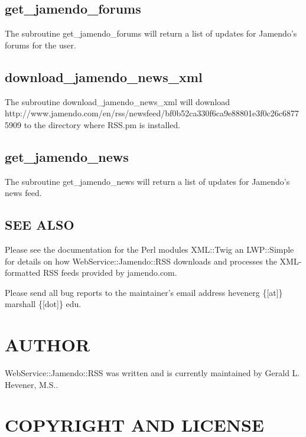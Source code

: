 \subsection*{get\_jamendo\_forums\label{get_jamendo_forums}}


The subroutine get\_jamendo\_forums will return a list of updates for Jamendo's forums for the user.

\subsection*{download\_jamendo\_news\_xml\label{download_jamendo_news_xml}}


The subroutine download\_jamendo\_news\_xml will download http://www.jamendo.com/en/rss/newsfeed/bf0b52ca330f6ca9e88801e3f0c26c68775909
to the directory where RSS.pm is installed.

\subsection*{get\_jamendo\_news\label{get_jamendo_news}}


The subroutine get\_jamendo\_news will return a list of updates for Jamendo's news feed.

\subsection*{SEE ALSO\label{SEE_ALSO}}


Please see the documentation for the Perl modules XML::Twig an LWP::Simple
for details on how WebService::Jamendo::RSS downloads and processes the XML-formatted
RSS feeds provided by jamendo.com.



Please send all bug reports to the maintainer's email address hevenerg \{[at]\} marshall \{[dot]\} edu.

\section{AUTHOR\label{AUTHOR}}


WebService::Jamendo::RSS was written and is currently maintained by Gerald L. Hevener, M.S..

\section{COPYRIGHT AND LICENSE\label{COPYRIGHT_AND_LICENSE}}


